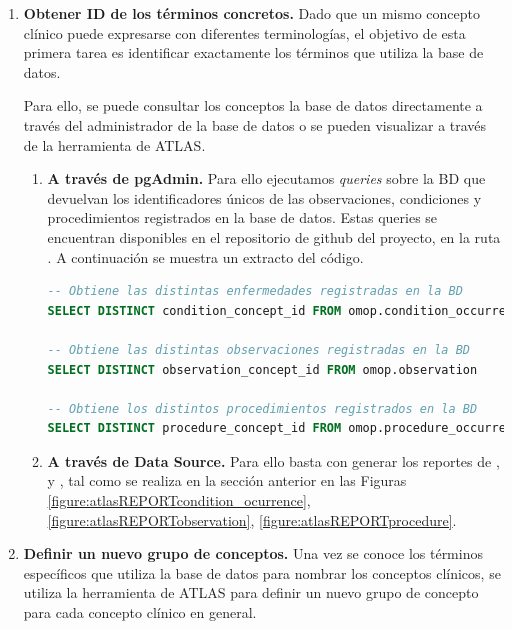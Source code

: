 \begin{enumerate}
    \item \textbf{Obtener ID de los términos concretos.} Dado que un mismo concepto clínico puede expresarse con diferentes terminologías, el objetivo de esta primera tarea es identificar exactamente los términos que utiliza la base de datos.

    Para ello, se puede consultar los conceptos la base de datos directamente a través del administrador de la base de datos o se pueden visualizar a través de la herramienta  de ATLAS.

    \begin{enumerate}[label=\alph*.]
        \item \textbf{A través de pgAdmin.} Para ello ejecutamos \textit{queries} sobre la BD que devuelvan los identificadores únicos de las observaciones, condiciones y procedimientos registrados en la base de datos. Estas queries se encuentran disponibles en el repositorio de github del proyecto, en la ruta . A continuación se muestra un extracto del código.

\begin{lstlisting}[language=sql]
-- Obtiene las distintas enfermedades registradas en la BD
SELECT DISTINCT condition_concept_id FROM omop.condition_occurrence

-- Obtiene las distintas observaciones registradas en la BD
SELECT DISTINCT observation_concept_id FROM omop.observation

-- Obtiene los distintos procedimientos registrados en la BD
SELECT DISTINCT procedure_concept_id FROM omop.procedure_occurrence
\end{lstlisting}


        \item \textbf{A través de Data Source.} Para ello basta con generar los reportes de ,  y , tal como se realiza en la sección anterior en las Figuras \ref{figure:atlasREPORTcondition_ocurrence}, \ref{figure:atlasREPORTobservation}, \ref{figure:atlasREPORTprocedure}.
        
    \end{enumerate}

    \item \textbf{Definir un nuevo grupo de conceptos.} Una vez se conoce los términos específicos que utiliza la base de datos para nombrar los conceptos clínicos, se utiliza la herramienta  de ATLAS para definir un nuevo grupo de concepto para cada concepto clínico en general. 


\end{enumerate}
